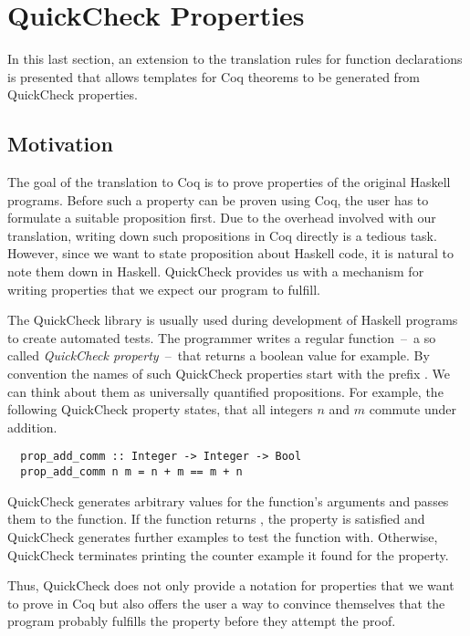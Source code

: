 \section{QuickCheck Properties} \label{sec:translation:quickcheck}
In this last section, an extension to the translation rules for function declarations is presented that allows templates for Coq theorems to be generated from QuickCheck properties.

\subsection{Motivation} \label{sec:translation:quickcheck:motivation}
The goal of the translation to Coq is to prove properties of the original Haskell programs.
Before such a property can be proven using Coq, the user has to formulate a suitable proposition first.
Due to the overhead involved with our translation, writing down such propositions in Coq directly is a tedious task.
However, since we want to state proposition about Haskell code, it is natural to note them down in Haskell.
QuickCheck provides us with a mechanism for writing properties that we expect our program to fulfill.

The QuickCheck library is usually used during development of Haskell programs to create automated tests.
The programmer writes a regular function~--~a so called \textit{QuickCheck property}~--~that returns a boolean value for example.
By convention the names of such QuickCheck properties start with the prefix .
We can think about them as universally quantified propositions.
For example, the following QuickCheck property states, that all integers $n$ and $m$ commute under addition.
\begin{verbatim}
  prop_add_comm :: Integer -> Integer -> Bool
  prop_add_comm n m = n + m == m + n
\end{verbatim}
QuickCheck generates arbitrary values for the function's arguments and passes them to the function.
If the function returns , the property is satisfied and QuickCheck generates further examples to test the function with.
Otherwise, QuickCheck terminates printing the counter example it found for the property.

Thus, QuickCheck does not only provide a notation for properties that we want to prove in Coq but also offers the user a way to convince themselves that the program probably fulfills the property before they attempt the proof.

